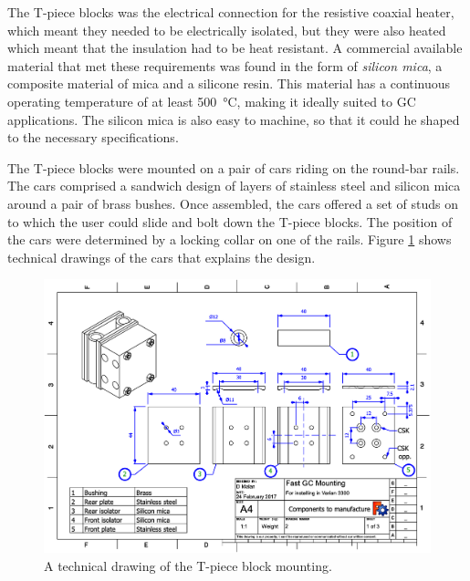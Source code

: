 The T-piece blocks was the electrical connection for the resistive coaxial heater,
which meant they needed to be electrically isolated, but they were also heated
which meant that the insulation had to be heat resistant. A commercial available
material that met these requirements was found in the form of \textit{silicon
mica}, a composite material of mica and a silicone resin. This material has a
continuous operating temperature of at least \SI{500}{\celsius}, making it
ideally suited to GC applications. The silicon mica is also easy to machine, so
that it could he shaped to the necessary specifications.

The T-piece blocks were mounted on a pair of cars riding on the round-bar rails.
The cars comprised a sandwich design of layers of stainless steel and silicon
mica around a pair of brass bushes. Once assembled, the cars offered a set of
studs on to which the user could slide and bolt down the T-piece blocks. The
position of the cars were determined by a locking collar on one of the rails.
Figure \ref{fig:CarsDrawing1} shows technical drawings of the cars that explains
the design.

\begin{figure}
	\centering
	\includegraphics[angle=90, origin=c, scale=0.75]{Figures/CarDrawing1.pdf}
	\decoRule	
\caption[Technical drawing of coaxial heater mounting.]{A technical drawing of the T-piece block mounting.} 
	\label{fig:CarsDrawing1}
\end{figure}


